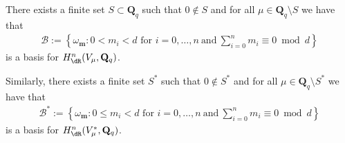 \begin{Lemma}\label{lemBasis} There exists a finite set $S\subset \mathbf{Q}_q$ such that $0\not \in S$ and for all $\mu\in \mathbf{Q}_q\setminus S$ we have that
\begin{gather*}\mathcal{B}:=\left \{\omega_{\mathbf{m}} \colon 0<m_i<d \mbox{ for } i=0,\dots, n \ \text{and} \ \sum_{i=0}^n m_i\equiv 0 \bmod d\right \}\end{gather*}
is a basis for $H^n_{\dR}(V_\mu,\mathbf{Q}_q)$.

Similarly, there exists a finite set $S^*$ such that $0\not \in S^*$ and for all $\mu\in\mathbf{Q}_q\setminus S^*$ we have that
\begin{gather*}\mathcal{B}^*:=\left \{\omega_{\mathbf{m}} \colon 0\leq m_i<d \mbox{ for } i=0,\dots, n \ \text{and} \ \sum_{i=0}^n m_i\equiv 0 \bmod d\right\}\end{gather*}
is a basis for $H^n_{\dR}(V_\mu^*,\mathbf{Q}_q)$.
\end{Lemma}
